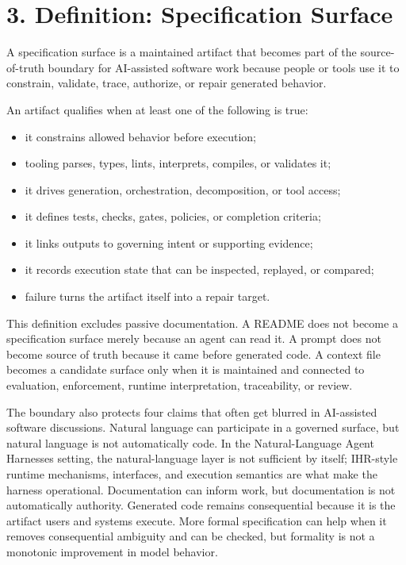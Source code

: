 \documentclass[
]{article}
\providecommand{\tightlist}{%
  \setlength{\itemsep}{0pt}\setlength{\parskip}{0pt}}
\begin{document}
\section{3. Definition: Specification
Surface}\label{definition-specification-surface}

A specification surface is a maintained artifact that becomes part of
the source-of-truth boundary for AI-assisted software work because
people or tools use it to constrain, validate, trace, authorize, or
repair generated behavior.

An artifact qualifies when at least one of the following is true:

\begin{itemize}
\tightlist
\item
  it constrains allowed behavior before execution;
\item
  tooling parses, types, lints, interprets, compiles, or validates it;
\item
  it drives generation, orchestration, decomposition, or tool access;
\item
  it defines tests, checks, gates, policies, or completion criteria;
\item
  it links outputs to governing intent or supporting evidence;
\item
  it records execution state that can be inspected, replayed, or
  compared;
\item
  failure turns the artifact itself into a repair target.
\end{itemize}

This definition excludes passive documentation. A README does not become
a specification surface merely because an agent can read it. A prompt
does not become source of truth because it came before generated code. A
context file becomes a candidate surface only when it is maintained and
connected to evaluation, enforcement, runtime interpretation,
traceability, or review.

The boundary also protects four claims that often get blurred in
AI-assisted software discussions. Natural language can participate in a
governed surface, but natural language is not automatically code. In the
Natural-Language Agent Harnesses setting, the natural-language layer is
not sufficient by itself; IHR-style runtime mechanisms, interfaces, and
execution semantics are what make the harness operational. Documentation
can inform work, but documentation is not automatically authority.
Generated code remains consequential because it is the artifact users
and systems execute. More formal specification can help when it removes
consequential ambiguity and can be checked, but formality is not a
monotonic improvement in model behavior.
\end{document}
